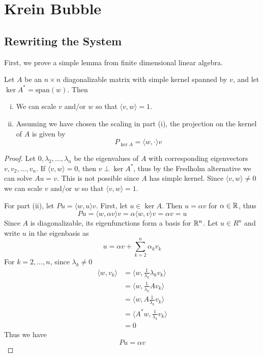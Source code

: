 \documentclass[thesis.tex]{subfiles}
\begin{document}
\chapter{Krein Bubble}

\section{Rewriting the System}

First, we prove a simple lemma from finite dimensional linear algebra.

\begin{lemma}
Let $A$ be an $n \times n$ diagonalizable matrix with simple kernel spanned by $v$, and let $\ker A^* = \text{span}(w)$. Then 
\begin{enumerate}[(i)]
\item We can scale $v$ and/or $w$ so that $\langle v, w \rangle = 1$.
\item Assuming we have chosen the scaling in part (i), the projection on the kernel of $A$ is given by
\[
P_{\ker A} = \langle w, \cdot \rangle v
\]
\end{enumerate}
\begin{proof}
Let $0, \lambda_2, \dots, \lambda_n$ be the eigenvalues of $A$ with corresponding eigenvectors $v, v_2, \dots, v_n$. If $\langle v, w \rangle = 0$, then $v \perp \ker A^*$, thus by the Fredholm alternative we can solve $A u = v$. This is not possible since $A$ has simple kernel. Since $\langle v, w \rangle \neq 0$ we can scale $v$ and/or $w$ so that $\langle v, w \rangle = 1$.

For part (ii), let $P u = \langle w, u \rangle v$.
First, let $u \in \ker A$. Then $u = \alpha v$ for $\alpha \in \mathbb{R}$, thus 
\[
P u = \langle w, \alpha v \rangle v = \alpha \langle w, v \rangle v = \alpha v = u
\]
Since $A$ is diagonalizable, its eigenfunctions form a basis for $\mathbb{R}^n$. Let $u \in R^n$ and write $u$ in the eigenbasis as
\[
u = \alpha v + \sum_{k=2}^n \alpha_k v_k
\]
For $k = 2, \dots, n$, since $\lambda_k \neq 0$
\begin{align*}
\langle w, v_k \rangle &= \langle w, \frac{1}{\lambda_k}\lambda_k v_k \rangle \\
&= \langle w, \frac{1}{\lambda_k} A v_k \rangle \\
&= \langle w, A \frac{1}{\lambda_k} v_k \rangle \\
&= \langle A^* w, \frac{1}{\lambda_k} v_k \rangle \\
&= 0
\end{align*}
Thus we have
\[
P u = \alpha v
\]
\end{proof}
\end{lemma}
\end{document}
